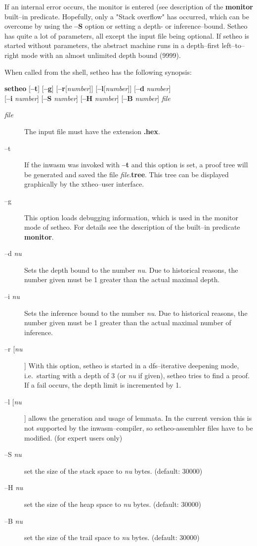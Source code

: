 If an internal error occurs, the monitor is entered (see description
of the {\bf monitor} built--in predicate.
Hopefully, only a "Stack overflow" has occurred, which can be overcome
by using the {\bf --S} option or setting a depth- or inference--bound.
Setheo has quite a lot of parameters, all except the input file being optional.
If setheo is started without parameters, the abstract machine runs in
a depth--first left--to--right mode with an almost unlimited depth bound
(9999).

When called from the shell, setheo has the following synopsis:
\begin{center}
{\bf setheo}
[{\bf --t}]
[{\bf --g}]
[{\bf --r\/}[{\it number\/}]]
[{\bf --l\/}[{\it number\/}]]
[{\bf --d} {\it number\/}] \\

[{\bf --i} {\it number\/}]
[{\bf --S} {\it number\/}]
[{\bf --H} {\it number\/}]
[{\bf --B} {\it number\/}]
{\it file}
\end{center}

\begin{description}
\item[{\it file\/}]
The input file must have the extension {\bf .hex}.
\item[--t]
If the inwasm was invoked with {\bf --t} and this option is set,
a proof tree will be generated and saved the file {\it file\/}.{\bf tree}.
This tree can be displayed graphically by the xtheo--user interface.
\item[--g] This option loads debugging information, which is used
in the monitor mode of setheo. For details see the description of
the built--in predicate {\bf monitor}.
\item[--d {\it nu\/}]
Sets the depth bound to the number {\it nu\/}. Due to historical reasons,
the number given must be 1 greater than the actual maximal depth.
\item[--i {\it nu\/}]
Sets the inference bound to the number {\it nu\/}. Due to historical reasons,
the number given must be 1 greater than the actual maximal number of inference.
\item[--r [{\it nu\/}]]
With this option, setheo is started in a dfs--iterative deepening mode,
i.e.\ starting with a depth of 3 (or {\it nu\/} if given), setheo
tries to find a proof. If a fail occurs, the depth limit is incremented
by 1.
\item[--l [{\it nu\/}]]
allows the generation and usage of lemmata. In the current version
this is not supported by the inwasm--compiler, so setheo-assembler files
have to be modified. (for expert users only)
\item[--S {\it nu\/}]
set the size of the stack space to {\it nu\/} bytes. (default: 30000)
\item[--H {\it nu\/}]
set the size of the heap space to {\it nu\/} bytes. (default: 30000)
\item[--B {\it nu\/}]
set the size of the trail space to {\it nu\/} bytes. (default: 30000)
\end{description}
